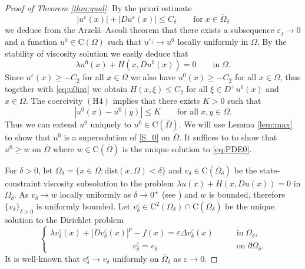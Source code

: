 \documentclass[11pt,reqno]{amsart}
\numberwithin{figure}{section}
\theoremstyle{plain}
\theoremstyle{remark}
\numberwithin{equation}{section}
\newcommand{\rmC}{\mathrm{C}}
\begin{document}
\begin{proof}[Proof of Theorem \ref{thm:qual}] By the priori estimate
\begin{equation*}
    |u^\varepsilon(x)| + |Du^\varepsilon(x)| \leq C_\delta \qquad\text{for}\;x\in \overline{\Omega}_\delta
\end{equation*}
we deduce from the Arzel\'a--Ascoli theorem that there exists a subsequence $\varepsilon_j\to 0$ and a function $u^0\in \rmC(\Omega)$ such that $u^{\varepsilon_j}\to u^0$ locally uniformly in $\Omega$. By the stability of viscosity solution we easily deduce that 
\begin{equation}\label{eq:u0int}
   \lambda u^0(x) + H(x,Du^0(x)) = 0 \qquad\text{in}\;\Omega.
\end{equation}
Since $u^\varepsilon(x)\geq -C_2$ for all $x\in \Omega$ we also have $u^0(x)\geq -C_2$ for all $x\in \Omega$, thus together with \eqref{eq:u0int} we obtain $H(x,\xi) \leq C_2$ for all $\xi\in D^+u^0(x)$ and $x\in \Omega$. The coercivity $\mathrm{(H4)}$ implies that there exists $K>0$ such that 
\begin{equation*}
    |u^0(x) - u^0(y)| \leq K \qquad\text{for all}\;x,y\in \Omega.
\end{equation*}
Thus we can extend $u^0$ uniquely to $u^0\in \rmC(\overline{\Omega})$. We will use Lemma \ref{lem:max} to show that $u^0$ is a supersolution of \eqref{S_0} on $\overline{\Omega}$. It suffices to to show that $u^0\geq w$ on $\overline{\Omega}$ where $w\in \rmC(\overline{\Omega})$ is the unique solution to \eqref{eq:PDE0}.

For $\delta>0$, let $\Omega_\delta = \{x\in \Omega: \mathrm{dist}(x,\Omega) < \delta\}$ and $v_\delta\in\rmC(\overline{\Omega}_\delta)$ be the state-constraint viscosity subsolution to the problem $\lambda u(x) + H(x,Du(x)) = 0$ in $\Omega_\delta$. As $v_\delta\rightarrow w$ locally uniformly as $\delta\rightarrow 0^+$ (see \cite{kim_state-constraint_2020}) and $w$ is bounded, therefore $\{v_\delta\}_{\delta>0}$ is uniformly bounded. Let $v^\varepsilon_\delta\in \rmC^2(\Omega_\delta)\cap \rmC(\overline{\Omega}_\delta)$ be the unique solution to the Dirichlet problem
\begin{equation}\label{eq:vv_eps}
\begin{cases}
    \lambda v_\delta^\varepsilon(x) + |Dv_\delta^\varepsilon(x)|^p - f(x) = \varepsilon \Delta v_\delta^\varepsilon(x) &\qquad\text{in}\;\Omega_\delta,\\
    \;\;\;\,\quad\qquad\qquad\qquad\qquad v_\delta^\varepsilon = v_\delta &\qquad \text{on}\;\partial\Omega_\delta.
\end{cases}
\end{equation}
It is well-known that $v^\varepsilon_\delta\to v_\delta$ uniformly on $\overline{\Omega}_\delta$ as $\varepsilon\to 0$.


\end{proof}
\end{document}
